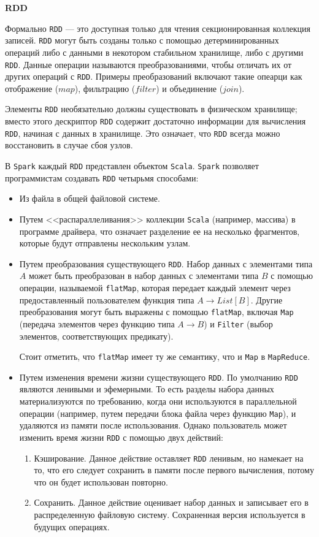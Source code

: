 \textbf{RDD}

Формально \texttt{RDD} --- это доступная только для чтения секционированная коллекция записей. 
\texttt{RDD} могут быть созданы только с помощью детерминированных операций либо с данными в некотором стабильном хранилище, либо с другими \texttt{RDD}. 
Данные операции называются преобразованиями, чтобы отличать их от других операций с \texttt{RDD}. 
Примеры преобразований включают такие опеарци как отображение ($map$), фильтрацию ($filter$) и объединение ($join$).

Элементы \texttt{RDD} необязательно должны существовать в физическом хранилище; 
вместо этого дескриптор \texttt{RDD} содержит достаточно информации для вычисления \texttt{RDD}, начиная с данных в хранилище. 
Это означает, что \texttt{RDD} всегда можно восстановить в случае сбоя узлов. 

В \texttt{Spark} каждый \texttt{RDD} представлен объектом \texttt{Scala}.
\texttt{Spark} позволяет программистам создавать \texttt{RDD} четырьмя способами:

\begin{itemize}
  \item Из файла в общей файловой системе.
  \item Путем <<распараллеливания>> коллекции \texttt{Scala} (например, массива) в программе драйвера, что означает разделение ее на несколько фрагментов, которые будут отправлены нескольким узлам.
  \item Путем преобразования существующего \texttt{RDD}. 
    Набор данных с элементами типа $A$ может быть преобразован в набор данных с элементами типа $B$ с помощью операции, называемой \texttt{flatMap}, которая передает каждый элемент через предоставленный пользователем функция типа $A \rightarrow List[B]$. 
    Другие преобразования могут быть выражены с помощью \texttt{flatMap}, включая \texttt{Map} (передача элементов через функцию типа $A \rightarrow B$) и \texttt{Filter} (выбор элементов, соответствующих предикату).
    
    Стоит отметить, что \texttt{flatMap} имеет ту же семантику, что и \texttt{Map} в \texttt{MapReduce}.
  \item Путем изменения времени жизни существующего \texttt{RDD}.
    По умолчанию \texttt{RDD} являются ленивыми и эфемерными. 
    То есть разделы набора данных материализуются по требованию, когда они используются в параллельной операции (например, путем передачи блока файла через функцию \texttt{Map}), и удаляются из памяти после использования. 
    Однако пользователь может изменить время жизни \texttt{RDD} с помощью двух действий:
    \begin{enumerate}
      \item Кэширование. 
        Данное действие оставляет \texttt{RDD} ленивым, но намекает на то, что его следует сохранить в памяти после первого вычисления, потому что он будет использован повторно.
      \item Сохранить. 
        Данное действие оценивает набор данных и записывает его в распределенную файловую систему. 
        Сохраненная версия используется в будущих операциях.
    \end{enumerate}
\end{itemize}

